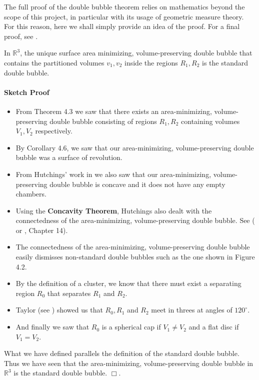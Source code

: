 \documentclass[a4paper,12pt]{report}
\begin{document}
The full proof of the double bubble theorem relies on mathematics beyond the scope of this project, in particular with its usage of geometric measure theory. For this reason, here we shall simply provide an idea of the proof. For a final proof, see \cite{db}.

\begin{theorem}
In $\mathbb{R}^{3}$, the unique surface area minimizing, volume-preserving double bubble that contains the partitioned volumes $v_{1},v_{2}$ inside the regions $R_{1},R_{2}$ is the standard double bubble.
\end{theorem}

\paragraph{Sketch Proof}
\begin{itemize}
\item From Theorem 4.3 we saw that there exists an area-minimizing, volume-preserving double bubble consisting of regions $R_{1}, R_{2}$ containing volumes $V_{1}, V_{2}$ respectively.
\item By Corollary 4.6, we saw that our area-minimizing, volume-preserving double bubble was a surface of revolution.
\item From Hutchings' work in \cite{hutchings} we also saw that our area-minimizing, volume-preserving double bubble is concave and it does not have any empty chambers. 
\item Using the \textbf{Concavity Theorem}, Hutchings also dealt with the connectedness of the area-minimizing, volume-preserving double bubble. See (\cite{hutchings} or \cite{morgan}, Chapter 14).
\item The connectedness of the area-minimizing, volume-preserving double bubble easily dismisses non-standard double bubbles such as the one shown in Figure 4.2.
\item By the definition of a cluster, we know that there must exist a separating region $R_{0}$ that separates $R_{1}$ and $R_{2}$.
\item Taylor (see \cite{taylor}) showed us that $R_{0}, R_{1}$ and $R_{2}$ meet in threes at angles of $120^{\circ}$.
\item And finally we saw that $R_{0}$ is a spherical cap if $V_{1} \neq V_{2}$ and a flat disc if $V_{1} = V_{2}$.
\end{itemize}

\hspace{-0.66cm}What we have defined parallels the definition of the standard double bubble. Thus we have seen that the area-minimizing, volume-preserving double bubble in $\mathbb{R}^{3}$ is the standard double bubble. \hfill $\Box$.
\end{document}
